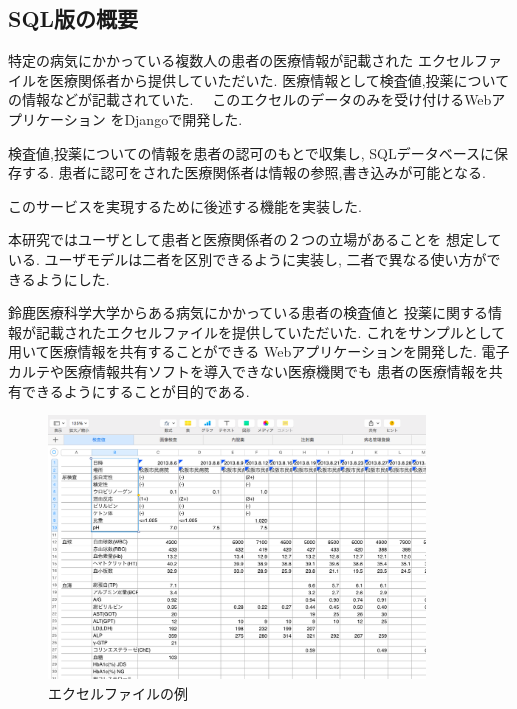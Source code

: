 \subsection{SQL版の概要}

  特定の病気にかかっている複数人の患者の医療情報が記載された
  エクセルファイルを医療関係者から提供していただいた.
  医療情報として検査値,投薬についての情報などが記載されていた.
　このエクセルのデータのみを受け付けるWebアプリケーション
  をDjangoで開発した.

  検査値,投薬についての情報を患者の認可のもとで収集し,
  SQLデータベースに保存する.
  患者に認可をされた医療関係者は情報の参照,書き込みが可能となる.

  このサービスを実現するために後述する機能を実装した.

  本研究ではユーザとして患者と医療関係者の２つの立場があることを
  想定している.
  ユーザモデルは二者を区別できるように実装し,
  二者で異なる使い方ができるようにした.
  \fi


  鈴鹿医療科学大学からある病気にかかっている患者の検査値と
  投薬に関する情報が記載されたエクセルファイルを提供していただいた.
  これをサンプルとして用いて医療情報を共有することができる
  Webアプリケーションを開発した.
  電子カルテや医療情報共有ソフトを導入できない医療機関でも
  患者の医療情報を共有できるようにすることが目的である.

  \begin{figure}[htbp]
    \begin{center}
      \includegraphics[width=10cm, bb=0 0 1049 733]{./gazou/excel-data.png}
    \end{center}
    \caption{エクセルファイルの例}
    \label{excel-data}
  \end{figure}

